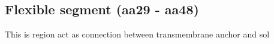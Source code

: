 \subsection{Flexible segment (aa29 - aa48)}

This is region act as connection between transmembrane anchor and sol
